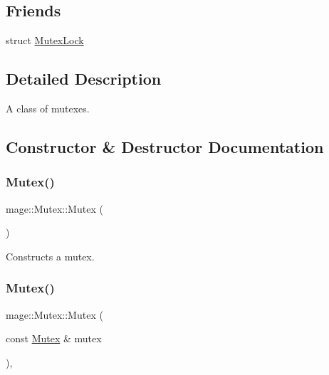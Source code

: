 \subsection*{Friends}
\begin{DoxyCompactItemize}
\item 
struct \hyperlink{classmage_1_1_mutex_a058473d070063e5098732f355f432bd9}{Mutex\+Lock}
\end{DoxyCompactItemize}


\subsection{Detailed Description}
A class of mutexes. 

\subsection{Constructor \& Destructor Documentation}
\hypertarget{classmage_1_1_mutex_ab22db01311271ef54642b10ea53dfd8a}{}\label{classmage_1_1_mutex_ab22db01311271ef54642b10ea53dfd8a} 
\subsubsection{\texorpdfstring{Mutex()}{Mutex()}\hspace{0.1cm}{\footnotesize\ttfamily [1/2]}}
{\footnotesize\ttfamily mage\+::\+Mutex\+::\+Mutex (\begin{DoxyParamCaption}{ }\end{DoxyParamCaption})\hspace{0.3cm}{\ttfamily [private]}}

Constructs a mutex. \hypertarget{classmage_1_1_mutex_af1c2c7d0134ba853903522d2f3684f22}{}\label{classmage_1_1_mutex_af1c2c7d0134ba853903522d2f3684f22} 
\subsubsection{\texorpdfstring{Mutex()}{Mutex()}\hspace{0.1cm}{\footnotesize\ttfamily [2/2]}}
{\footnotesize\ttfamily mage\+::\+Mutex\+::\+Mutex (\begin{DoxyParamCaption}\item[{const \hyperlink{classmage_1_1_mutex}{Mutex} \&}]{mutex }\end{DoxyParamCaption})\hspace{0.3cm}{\ttfamily [private]}, {\ttfamily [delete]}}

